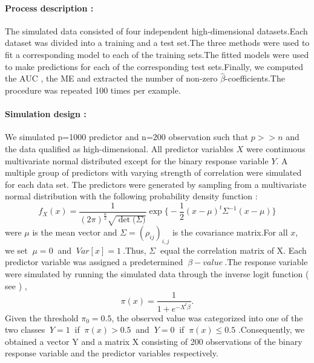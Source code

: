 \documentclass[12pt]{report}
\begin{document}
	\paragraph{Process description :}
	The simulated data consisted of four independent high-dimensional datasets.Each dataset was divided into a training and a test set.The three methods were used to fit a corresponding model to each of the training sets.The fitted models were used to make predictions for each of the corresponding test sets.Finally, we computed the AUC , the ME and extracted the number of non-zero $\hat{\beta}$-coefficients.The procedure was repeated 100 times per example.
	\paragraph{Simulation design :}
	We simulated p=1000 predictor and n=200 observation such that $p>>n$ and the data qualified as high-dimensional. All predictor variables $X$ were continuous multivariate normal distributed except for the binary response variable $Y$. A multiple group of predictors with varying strength of correlation were simulated for each data set. The predictors were generated by sampling from a multivariate normal distribution with the following probability density function :
	$$ f_{X}(x)=\frac{1}{(2\pi)^{\frac{n}{2}} \sqrt{\det\big(\Sigma\big)}}\exp\bigg\{-\frac{1}{2}(x-\mu)^{t}\Sigma^{-1}(x-\mu)\bigg\}$$  
	were $\mu$ is the mean vector and $\Sigma=(\rho_{ij})_{i,j}$  is the covariance matrix.For all $x$, we set $\ \mu=0\ $ and $\ Var[x]=1\ $.Thus, $\Sigma\ $ equal the correlation matrix of X. Each predictor variable was assigned a predetermined $\ \beta-value\ $.The response variable were simulated by running the simulated data through the inverse logit function ( see \cite{nref29}) ,
	$$\pi(x)=\frac{1}{1+e^{-X^{t}\beta}}.$$
	Given the threshold $\pi_{0}=0.5$, the observed value was categorized into one of the two classes $\ Y=1\ $ if $\ \pi(x)>0.5\ $ and $\ Y=0\ $ if $\ \pi(x)\leq0.5$ .Consequently, we obtained a vector Y and a matrix X consisting of 200 observations of the binary response variable and the predictor variables respectively.
\end{document}
